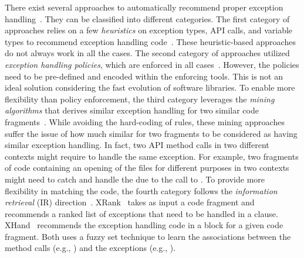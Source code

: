 There exist several approaches to automatically recommend proper
exception
handling~\cite{barbosa-bsse12,chanchal-scam14,barbosa-tse18,barbosa-tse16,xrank-fse20,throw-ase22}. They
can be classified into different categories. The first category of
approaches relies on a few {\em heuristics} on exception types, API
calls, and variable types to recommend exception handling
code~\cite{barbosa-bsse12}. These heuristic-based approaches do not
always work in all the cases. The second category of approaches
utilized {\em exception handling policies}, which are enforced in all
cases~\cite{barbosa-tse16,barbosa-saner18}. However, the policies need
to be pre-defined and encoded within the enforcing tools.  This is not
an ideal solution considering the fast evolution of software
libraries. To enable more flexibility than policy enforcement, the
third category leverages the {\em mining algorithms} that derives
similar exception handling for two similar code
fragments~\cite{chanchal-scam14}. While avoiding the hard-coding of
rules, these mining approaches suffer the issue of how much similar
for two fragments to be considered as having similar exception
handling. In fact, two API method calls in two different contexts
might require to handle the same exception. For example, two fragments
of code containing an opening of the files for different purposes in
two contexts might need to catch and handle the  due
to the call to . To provide more
flexibility in matching the code, the fourth category follows the {\em
  information retrieval} (IR)
direction~\cite{xrank-fse20}. XRank~\cite{xrank-fse20} takes as input
a code fragment and recommends a ranked list of exceptions that need
to be handled in a  clause. XHand~\cite{xrank-fse20}
recommends the exception handling code in a  block for a
given code fragment. Both uses a fuzzy set technique to learn the
associations between the method calls (e.g.,
) and the exceptions (e.g.,
).

